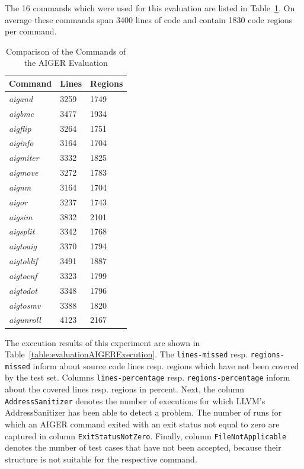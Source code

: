The 16 commands which were used for this evaluation are listed in Table~\ref{table:evaluationAIGERCommands}. On average these commands span 3400 lines of code and contain 1830 code regions per command.

\begin{table}
\caption{Comparison of the Commands of the AIGER Evaluation}
\label{table:evaluationAIGERCommands}
\center
\begin{tabular}{| l | l | l |}
\hline \textbf{Command} & \textbf{Lines} & \textbf{Regions} \tabularnewline
\hline \emph{aigand} & 3259 & 1749 \tabularnewline
\hline \emph{aigbmc} & 3477 & 1934 \tabularnewline
\hline \emph{aigflip} & 3264 & 1751 \tabularnewline
\hline \emph{aiginfo} & 3164 & 1704 \tabularnewline
\hline \emph{aigmiter} & 3332 & 1825 \tabularnewline
\hline \emph{aigmove} & 3272 & 1783 \tabularnewline
\hline \emph{aignm} & 3164 & 1704 \tabularnewline
\hline \emph{aigor} & 3237 & 1743 \tabularnewline
\hline \emph{aigsim} & 3832 & 2101 \tabularnewline
\hline \emph{aigsplit} & 3342 & 1768 \tabularnewline
\hline \emph{aigtoaig} & 3370 & 1794 \tabularnewline
\hline \emph{aigtoblif} & 3491 & 1887 \tabularnewline
\hline \emph{aigtocnf} & 3323 & 1799 \tabularnewline
\hline \emph{aigtodot} & 3348 & 1796 \tabularnewline
\hline \emph{aigtosmv} & 3388 & 1820 \tabularnewline
\hline \emph{aigunroll} & 4123 & 2167 \tabularnewline
\hline
\end{tabular}
\end{table}

The execution results of this experiment are shown in Table~\ref{table:evaluationAIGERExecution}. The \texttt{lines-missed} resp. \texttt{regions-missed} inform about source code lines resp. regions which have not been covered by the test set. Columns \texttt{lines-percentage} resp. \texttt{regions-percentage} inform about the covered lines resp. regions in percent. Next, the column \texttt{AddressSanitizer} denotes the number of executions for which LLVM's AddressSanitizer has been able to detect a problem. The number of runs for which an AIGER command exited with an exit status not equal to zero are captured in column \texttt{ExitStatusNotZero}. Finally, column \texttt{FileNotApplicable} denotes the number of test cases that have not been accepted, because their structure is not suitable for the respective command.

